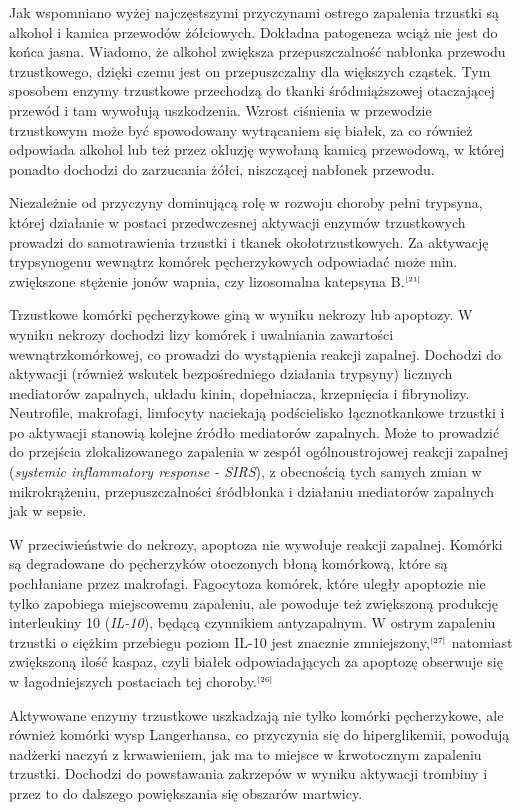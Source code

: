 \documentclass[a4paper, 12pt]{report}
\newcommand\cyt[1]{$^{\tiny{\cite{#1}}}$}
\begin{document}
Jak wspomniano wyżej najczęstszymi przyczynami ostrego zapalenia
trzustki są alkohol i kamica przewodów żółciowych. Dokładna patogeneza
wciąż nie jest do końca jasna. Wiadomo, że alkohol zwiększa
przepuszczalność nabłonka przewodu trzustkowego, dzięki czemu jest on
przepuszczalny dla większych cząstek. Tym sposobem enzymy trzustkowe
przechodzą do tkanki śródmiąższowej otaczającej przewód i tam wywołują
uszkodzenia. Wzrost ciśnienia w przewodzie trzustkowym może być spowodowany
wytrącaniem się białek, za co również odpowiada alkohol lub też przez
okluzję wywołaną kamicą przewodową, w której ponadto dochodzi do
zarzucania żółci, niszczącej nabłonek przewodu.

Niezależnie od przyczyny dominującą rolę w rozwoju choroby pełni
trypsyna, której działanie w postaci przedwczesnej aktywacji enzymów
trzustkowych prowadzi do samotrawienia trzustki i tkanek
okołotrzustkowych. Za aktywację trypsynogenu wewnątrz komórek
pęcherzykowych odpowiadać może min. zwiększone stężenie jonów wapnia,
czy lizosomalna katepsyna B.\cyt{21} 

Trzustkowe komórki pęcherzykowe giną w wyniku nekrozy lub apoptozy. W
wyniku nekrozy dochodzi lizy komórek i uwalniania zawartości
wewnątrzkomórkowej, co prowadzi do wystąpienia reakcji
zapalnej. Dochodzi do aktywacji (również wskutek bezpośredniego
działania trypsyny) licznych mediatorów zapalnych, układu kinin,
dopełniacza, krzepnięcia i fibrynolizy. Neutrofile, makrofagi,
limfocyty naciekają podścielisko łącznotkankowe trzustki i po
aktywacji stanowią kolejne źródło mediatorów zapalnych. Może to
prowadzić do przejścia zlokalizowanego zapalenia w zespół
ogólnoustrojowej reakcji zapalnej (\textsl{systemic inflammatory
  response - SIRS}), z obecnością tych samych zmian w mikrokrążeniu,
przepuszczalności śródbłonka i działaniu mediatorów zapalnych jak w
sepsie.

W przeciwieństwie do nekrozy, apoptoza nie wywołuje reakcji
zapalnej. Komórki są degradowane do pęcherzyków otoczonych błoną
komórkową, które są pochłaniane przez makrofagi. Fagocytoza komórek,
które uległy apoptozie nie tylko zapobiega miejscowemu zapaleniu, ale
powoduje też zwiększoną produkcję interleukiny 10 (\textsl{IL-10}),
będącą czynnikiem antyzapalnym. W ostrym zapaleniu trzustki o ciężkim
przebiegu poziom IL-10 jest znacznie zmniejszony,\cyt{27} natomiast
zwiększoną ilość kaspaz, czyli białek odpowiadających za apoptozę
obserwuje się w łagodniejszych postaciach tej choroby.\cyt{26}

Aktywowane enzymy trzustkowe uszkadzają nie tylko komórki
pęcherzykowe, ale również komórki wysp Langerhansa, co przyczynia się
do hiperglikemii, powodują nadżerki naczyń z krwawieniem, jak ma to
miejsce w krwotocznym zapaleniu trzustki. Dochodzi do powstawania
zakrzepów w wyniku aktywacji trombiny i przez to do dalszego
powiększania się obszarów martwicy. 
\end{document}
